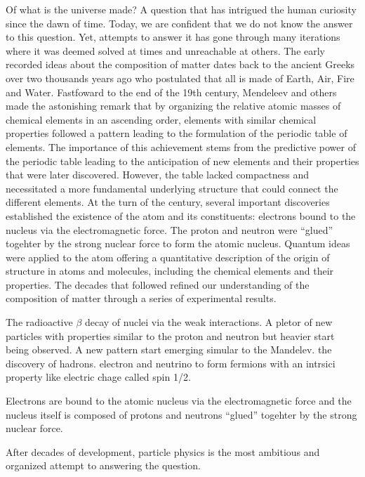 

Of what is the universe made? A question that has intrigued the human curiosity since the dawn of time. 
Today, we are confident that we do not know the answer to this question. 
Yet, attempts to answer it has gone through many iterations where it was deemed solved at times 
and unreachable at others. 
The early recorded ideas about the composition of matter dates back to the ancient Greeks over two thousands years ago 
who postulated that all is made of Earth, Air, Fire and Water. 
Fastfoward to the end of the 19th century, Mendeleev and others made the astonishing remark that by organizing the 
relative atomic masses of chemical elements in an ascending order, elements with similar chemical properties followed a pattern
leading to the formulation of the periodic table of elements. The importance of this achievement stems from the
predictive power of the periodic table leading to the anticipation of new elements and their properties that were later discovered.
However, the table lacked compactness and necessitated a more fundamental underlying structure that could 
connect the different elements. At the turn of the century, several important discoveries established 
the existence of the atom and its constituents: electrons bound to the nucleus via the electromagnetic force.
The proton and neutron were ``glued'' togehter by the strong nuclear force to form the atomic nucleus. 
Quantum ideas were applied to the atom offering a quantitative description of the origin of structure 
in atoms and molecules, including the chemical elements and their properties.
The decades that followed refined our understanding of the composition of matter through a series of experimental results.

The radioactive $\beta$ decay of nuclei via the weak interactions. A pletor of new particles with properties similar to the proton 
and neutron but heavier start being observed.
A new pattern start emerging simular to the Mandelev. 
the discovery of hadrons. 
electron and neutrino to form fermions with an intrsici property like electric chage called spin 1/2.

 

Electrons are bound to the atomic nucleus via the electromagnetic force
and the nucleus itself is composed of protons and neutrons ``glued'' togehter by the strong nuclear force.



After decades of development, particle physics is the most ambitious and organized attempt to answering the question.
